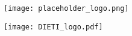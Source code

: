 \pagecolor{TERTIARY!90!violet}\afterpage{\nopagecolor}
\begin{titlepage}
  \begin{center}
    \vspace*{0.8cm}
    \Huge
    \textbf{\maintitle{}}

    \vspace*{0.5cm}

    \color{SECONDARY}
    \large
    \textbf{\authors{}}
    
    \vfill

    \texttt{[image: placeholder\_logo.png]}
    
    \vfill

    \vspace*{0.5cm}
    \texttt{[image: DIETI\_logo.pdf]}
    \vspace*{-0.5cm}
  \end{center}
\end{titlepage}
